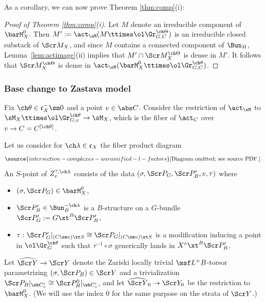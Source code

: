 As a corollary, we can now prove Theorem \ref{thm:comp}(i):

\begin{proof}[Proof of Theorem \ref{thm:comp}(i)]
Let $M$ denote an irreducible component of $\barM^0_X$.
Then $M':=\act_\sM(M \ttimes \ol\Gr^{\ch\Theta}_{G,C})$
is an irreducible closed substack of $\Scr M_X$,
and since $M$ contains a connected component of $\Bun_H$,
Lemma~\ref{lem:actimage}(ii) implies that
 $M' \cap \Scr M^{\ch\Theta}_X$ is dense in $M'$.
It follows that $\Scr M^{\ch\Theta}_X$ is dense in $\act_\sM(\barM^0_X \ttimes \ol\Gr^{\ch\theta}_{G,C})$.
\end{proof}


\subsubsection{Base change to Zastava model}
Fix $\ch\theta \in \mathfrak c_X^- \sm 0$
and a point $v \in \abs C$.
Consider the restriction of $\act_\sM$ to
$\sM_{X} \ttimes \ol\Gr^{\ch\theta}_{G,v} \to \sM_X$,
which is the fiber of $\act_C$ over
$v \to C = C^{[\ch\theta]}$.

Let us consider for $\ch\lambda\in \mathfrak c_X$
the fiber product diagram
\begin{equation}  \label{e:Zact-diagram}
\source{intersection-complexes-unramified-l-factors}
\text{[Diagram omitted; see source PDF.]}
\end{equation}
An $S$-point of $Z_v^{?,\ch\lambda}$ consists of the data $(\sigma,\Scr P_G, \Scr P'_B,
v, \tau)$ where
\begin{itemize}
\item $(\sigma,\Scr P_G) \in \barM_X^0$,
\item $\Scr P'_B\in \Bun_B^{-\ch\lambda}$ is a $B$-structure on a $G$-bundle $\Scr P'_G := G\xt^B \Scr P'_B$,
\item $\tau : \Scr P'_G|_{(C\sm v)\xt S} \cong \Scr P_G|_{(C\sm v)\xt S}$ is
a modification inducing a point in $\ol\Gr^{\ch\theta}_G$ such that
$\tau^{-1}\circ \sigma$ generically lands in $X^\circ \xt^B \Scr P'_B$.
\end{itemize}


Let $\widehat{\Scr Y} \to \Scr Y$
denote the Zariski locally trivial $\msf  L^+B$-torsor parametrizing
$(\sigma,\Scr P_B)\in \Scr Y$ and a trivialization
$\Scr P_B|_{\wh C'_v} \cong \Scr P_B^0|_{\wh C'_v}$, and let $\widehat{\Scr Y}_0 \to \Scr Y_0$ be the restriction to $\barM_X^0$. (We will use the index $0$ for the same purpose on the strata of $\Scr Y$.)


